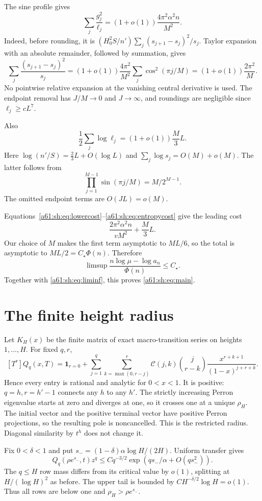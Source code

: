 \documentclass[11pt,letterpaper]{article}
\numberwithin{equation}{section}
\theoremstyle{remark}\newtheorem{remark}[theorem]{Remark}
\newcommand{\one}{\mathbf 1}
\newcommand{\st}{\star}
\begin{document}
The sine profile gives
\begin{equation}\label{a61:sh:eq:kinetic}
 \sum_j\frac{g_j^2}{\ell_j}
 =(1+o(1))\frac{4\pi^2\alpha^2n}{M^2}.
\end{equation}
Indeed, before rounding, it is $(H_0^2S/n')\sum_j(s_{j+1}-s_j)^2/s_j$. Taylor expansion with an absolute remainder, followed by summation, gives
\[
 \sum_j\frac{(s_{j+1}-s_j)^2}{s_j}
 =(1+o(1))\frac{4\pi^2}{M^2}\sum_j\cos^2(\pi j/M)
 =(1+o(1))\frac{2\pi^2}{M}.
\]
No pointwise relative expansion at the vanishing central derivative is used. The endpoint removal has $J/M\to0$ and $J\to\infty$, and roundings are negligible since $\ell_j\ge cL^7$.

Also
\begin{equation}\label{a61:sh:eq:entropycost}
 \frac12\sum_j\log\ell_j=(1+o(1))\frac M3L.
\end{equation}
Here $\log(n'/S)=\frac23L+O(\log L)$ and $\sum_j\log s_j=O(M)+o(M)$. The latter follows from
\[\prod_{j=1}^{M-1}\sin(\pi j/M)=M/2^{M-1}.\]
The omitted endpoint terms are $O(JL)=o(M)$.

Equations~\eqref{a61:sh:eq:lowercost}--\eqref{a61:sh:eq:entropycost} give the leading cost
\[
 \frac{2\pi^2\alpha^2n}{vM^2}+\frac M3L.
\]
Our choice of $M$ makes the first term asymptotic to $ML/6$, so the total is asymptotic to $ML/2=C_\st\Phi(n)$. Therefore
\[
 \limsup\frac{n\log\mu-\log a_n}{\Phi(n)}\le C_\st.
\]
Together with \eqref{a61:sh:eq:liminf}, this proves \eqref{a61:sh:eq:main}.

\section{The finite height radius}\label{a61:sh:sec:radius}
Let $K_H(x)$ be the finite matrix of exact macro-transition series on heights $1,\ldots,H$. For fixed $q,r$,
\[
 [T^r]Q_q(x,T)=\one_{r=0}
 +\sum_{j=1}^q\sum_{k=\max(0,r-j)}^r
 \mathcal C(j,k)\binom{j}{r-k}
 \frac{x^{r+k+1}}{(1-x)^{j+r+k}}.
\]
Hence every entry is rational and analytic for $0<x<1$. It is positive: $q=h,r=h'-1$ connects any $h$ to any $h'$. The strictly increasing Perron eigenvalue starts at zero and diverges at one, so it crosses one at a unique $\rho_H$. The initial vector and the positive terminal vector have positive Perron projections, so the resulting pole is noncancelled. This is the restricted radius. Diagonal similarity by $t^h$ does not change it.

Fix $0<\delta<1$ and put $s_-=(1-\delta)\alpha\log H/(2H)$. Uniform transfer gives
\[
 Q_q(\rho e^{s_-},t)z^q
 \le Cq^{-3/2}\exp(qs_-/\alpha+O(qs_-^2)).
\]
The $q\le H$ row mass differs from its critical value by $o(1)$, splitting at $H/(\log H)^2$ as before. The upper tail is bounded by
$C H^{-\delta/2}\log H=o(1)$. Thus all rows are below one and $\rho_H>\rho e^{s_-}$.
\end{document}
